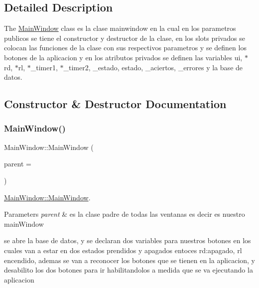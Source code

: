 \subsection{Detailed Description}
The \hyperlink{class_main_window}{Main\+Window} class es la clase mainwindow en la cual en los parametros publicos se tiene el constructor y destructor de la clase, en los slots privados se colocan las funciones de la clase con sus respectivos parametros y se definen los botones de la aplicacion y en los atributos privados se definen las variables ui, $\ast$rd, $\ast$rl, $\ast$\+\_\+timer1, $\ast$\+\_\+timer2, \+\_\+estado, estado, \+\_\+aciertos, \+\_\+errores y la base de datos. 

\subsection{Constructor \& Destructor Documentation}
\mbox{\label{class_main_window_a8b244be8b7b7db1b08de2a2acb9409db}} 
\subsubsection{\texorpdfstring{Main\+Window()}{MainWindow()}}
{\footnotesize\ttfamily Main\+Window\+::\+Main\+Window (\begin{DoxyParamCaption}\item[{Q\+Widget $\ast$}]{parent = {} }\end{DoxyParamCaption})\hspace{0.3cm}{\ttfamily [explicit]}}



\hyperlink{class_main_window_a8b244be8b7b7db1b08de2a2acb9409db}{Main\+Window\+::\+Main\+Window}. 


\begin{DoxyParams}{Parameters}
{\em parent} & es la clase padre de todas las ventanas es decir es nuestro main\+Window\\
\hline
\end{DoxyParams}
se abre la base de datos, y se declaran dos variables para nuestros botones en los cuales van a estar en dos estados prendidos y apagados entoces rd\+:apagado, rl encendido, ademas se van a reconocer los botones que se tienen en la aplicacion, y desabilito los dos botones para ir habilitandolos a medida que se va ejecutando la aplicacion \mbox{\label{class_main_window_ae98d00a93bc118200eeef9f9bba1dba7}} 
